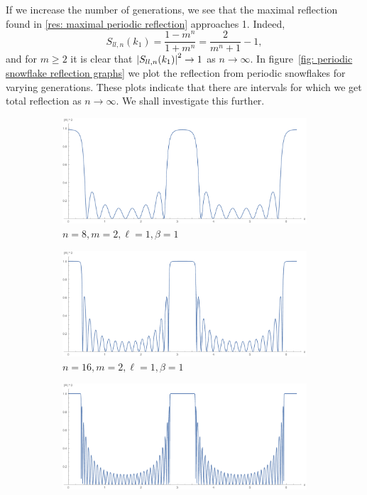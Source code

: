 If we increase the number of generations, we see that the maximal reflection found in \cref{res: maximal periodic reflection} approaches 1. Indeed,
\[
  S_{ll,n}(k_1) = \frac{1-m^n}{1+m^n} = \frac{2}{m^n+1} - 1,
\]
and for $m \ge 2$ it is clear that $\left\lvert S_{ll,n}(k_1)\right\rvert^2 \to 1$ as $n\to\infty$. In figure~\ref{fig: periodic snowflake reflection graphs} we plot the reflection from periodic snowflakes for varying generations. These plots indicate that there are intervals for which we get total reflection as $n\to\infty$. We shall investigate this further.

\begin{figure}[!h]
  \centering
  \begin{subfigure}[t]{0.8\textwidth}
    \includegraphics[width=\textwidth]{img/reflection_n=4_m=2_l=1_b=1_int=2pi}
    \caption{$n=8, m=2, \ell=1, \beta=1$}
  \end{subfigure}
  \begin{subfigure}[t]{0.8\textwidth}
    \includegraphics[width=\textwidth]{img/reflection_n=5_m=2_l=1_b=1_int=2pi}
    \caption{$n=16, m=2, \ell=1, \beta=1$}
  \end{subfigure}
  \begin{subfigure}[t]{0.8\textwidth}
    \includegraphics[width=\textwidth]{img/reflection_n=6_m=2_l=1_b=1_int=2pi}

\end{subfigure}
\end{figure}
